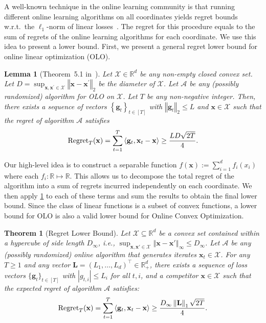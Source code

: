 \documentclass{article}
\newtheorem{thm}{Theorem}
\newtheorem{lem}{Lemma}
\def \x {\mathbf{x}}
\def \g {\mathbf{g}}
\def \R {\mathbb{R}}
\def \A {\mathcal{A}}
\def \Lb {\mathbf{L}}
\def \X {\mathcal{X}}
\newcommand{\inner}[2]{\left\langle #1, #2 \right\rangle}
\newcommand{\norm}[1]{\left\Vert#1\right\Vert}
\newcommand{\cbrac}[1]{\left\{#1\right\}}
\begin{document}
A well-known technique in the online learning community is that running different online learning algorithms on all coordinates yields regret bounds w.r.t.~the $\ell_1$-norm of linear losses~\citep{McMahanS10adagrad,duchi2011adaptive}. The regret for this procedure equals to the sum of regrets of the online learning algorithms for each coordinate. We use this idea to present a lower bound. First, we present a general regret lower bound for online linear optimization (OLO).

\begin{lem}[Theorem~5.1 in~\citet{orabona2019intro}]\label{lem:olo-lower-bound}
    Let $\X\in\R^d$ be any non-empty closed convex set. Let $D = \sup_{\x,\x^\prime\in\X}\norm{\x-\x^\prime}_2$ be the diameter of $\X$. Let $\A$ be any (possibly randomized) algorithm for OLO on $\X$. Let $T$ be any non-negative integer. Then, there exists a sequence of vectors $\cbrac{\g_t}_{t\in[T]}$ with $\norm{\g_t}_2 \le L$ and $\x\in\X$ such that the regret of algorithm $\A$ satisfies
    \begin{align*}
        \textnormal{Regret}_T(\x)=\sum_{t=1}^T\inner{\g_t}{\x_t-\x}\ge\frac{LD\sqrt{2T}}{4}.
    \end{align*}
\end{lem}

Our high-level idea is to construct a separable function $f(\x):=\sum_{i=1}^df_i(x_i)$ where each $f_i:\R\mapsto\R$. This allows us to decompose the total regret of the algorithm into a sum of regrets incurred independently on each coordinate. We then apply \cref{lem:olo-lower-bound} to each of these terms and sum the results to obtain the final lower bound. Since the class of linear functions is a subset of convex functions, a lower bound for OLO is also a valid lower bound for Online Convex Optimization.

\begin{thm}[Regret Lower Bound]\label{thm:oco-lower-bound}
    Let $\X \subseteq \R^d$ be a convex set contained within a hypercube of side length $D_\infty$, i.e., $\sup_{\x, \x' \in \X} \norm{\x - \x'}_\infty \le D_\infty$. Let $\A$ be any (possibly randomized) online algorithm that generates iterates $\x_t \in \X$. For any $T \ge 1$ and any vector $\Lb = (L_1, \dots, L_d)^\top \in \R^d_+$, there exists a sequence of loss vectors $\{\g_t\}_{t \in [T]}$ with $|g_{t,i}| \le L_i$ for all $t, i$, and a competitor $\x \in \X$ such that the expected regret of algorithm $\A$ satisfies:
    \begin{align*}
        \textnormal{Regret}_T(\x)=\sum_{t=1}^T \inner{\g_t}{\x_t - \x} \ge \frac{D_\infty \norm{\Lb}_1\sqrt{2T}}{4} .
    \end{align*}
\end{thm}
\end{document}
